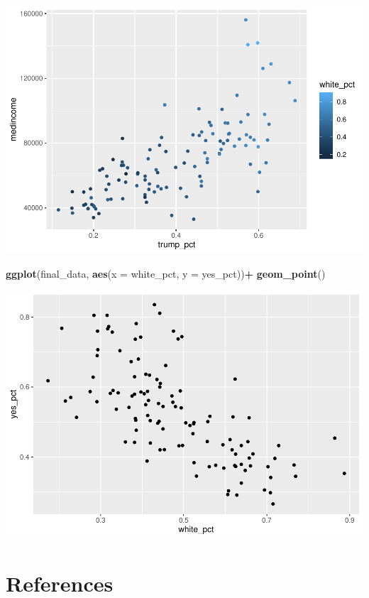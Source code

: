 \documentclass[
]{article}
\newenvironment{Shaded}{\begin{snugshade}}{\end{snugshade}}
\newcommand{\DataTypeTok}[1]{\textcolor[rgb]{0.13,0.29,0.53}{#1}}
\newcommand{\KeywordTok}[1]{\textcolor[rgb]{0.13,0.29,0.53}{\textbf{#1}}}
\newcommand{\NormalTok}[1]{#1}
\newcommand{\OperatorTok}[1]{\textcolor[rgb]{0.81,0.36,0.00}{\textbf{#1}}}
\newcommand{\StringTok}[1]{\textcolor[rgb]{0.31,0.60,0.02}{#1}}
\begin{document}
\includegraphics{Zhong_paper_files/figure-latex/unnamed-chunk-12-1.pdf}

\begin{Shaded}
\begin{Highlighting}[]
\KeywordTok{ggplot}\NormalTok{(final_data, }\KeywordTok{aes}\NormalTok{(}\DataTypeTok{x =}\NormalTok{ white_pct, }\DataTypeTok{y =}\NormalTok{ yes_pct))}\OperatorTok{+}
\StringTok{   }\KeywordTok{geom_point}\NormalTok{()}
\end{Highlighting}
\end{Shaded}

\includegraphics{Zhong_paper_files/figure-latex/unnamed-chunk-13-1.pdf}

\hypertarget{references}{%
\section{References}\label{references}}
\end{document}
